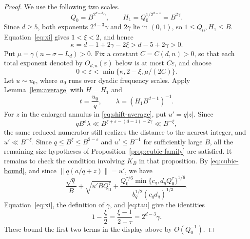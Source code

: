 \documentclass[reqno,a4paper,11pt]{amsart}
\numberwithin{equation}{section}
\newcommand{\eps}{\varepsilon}
\theoremstyle{plain}
\theoremstyle{definition}
\begin{document}
\begin{proof}
We use the following two scales.
\[
 Q_0=B^{2^{d-3}\gamma},\qquad
 H_1=Q_0^{1/2^{d-4}}=B^{2\gamma}.
\]
Since \(d\geq5\), both exponents \(2^{d-3}\gamma\) and \(2\gamma\) lie in \((0,1)\), so \(1\leq Q_0,H_1\leq B\).
Equation~\eqref{eq:xi} gives \(1<\xi<2\), and hence
\[
 \kappa=d-1+2\gamma-2\xi>d-5+2\gamma>0.
\]
Put \(\mu=\gamma(n-\sigma-L_d)>0\).
Fix a constant \(C = C(d, n)>0\), so that each total exponent denoted by \(O_{d,n}(\eps)\) below is at most \(C\eps\), and choose
\[
 0<\eps<\min\{\kappa,2-\xi,\mu/(2C)\}.
\]
Let \(u\sim u_0\), where \(u_0\) runs over dyadic frequency scales.
Apply Lemma~\ref{lem:average} with \(H=H_1\) and
\[
 t=\frac{u_0}{q},\qquad
 \lambda=(H_1B^{d-1})^{-1}.
\]
For \(z\) in the enlarged annulus in \eqref{eq:shift-average}, put \(u'=q|z|\).
Since
\[
 qB^\eps\lambda
 \ll B^{\xi+\eps-(d-1)-2\gamma}
 \ll B^{-\xi},
\]
the same reduced numerator still realizes the distance to the nearest integer, and \(u'\ll B^{-\xi}\).
Since \(q\leq B^\xi\leq B^{2-\eps}\) and \(u'\leq B^{-1}\) for sufficiently large \(B\), all the remaining size hypotheses of Proposition~\ref{prop:cubic-family} are satisfied.
It remains to check the condition involving \(K_B\) in that proposition.
By \eqref{eq:cubic-bound}, and since \(\|q(a/q+z)\|=u'\), we have
\[
\frac{\sqrt q}{B}
+\sqrt{u'BQ_0^\tau}
 + \frac{Q_0^{\tau/6}\min\{c_q,d_qQ_0^\tau\}^{1/6}}{b_q^{1/2}(c_qd_q)^{1/3}}.
\]
Equation~\eqref{eq:xi}, the definition of \(\gamma\), and \eqref{eq:tau} give the identities
\[
 1-\frac\xi2
 =\frac{\xi-1}{2+\tau}
 =2^{d-3}\gamma.
\]
These bound the first two terms in the display above by \(O(Q_0^{-1})\).


\end{proof}
\end{document}
